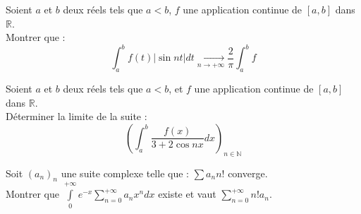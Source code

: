 \begin{exer}
Soient $a$ et $b$ deux réels tels que $a < b$, $f$ une application continue de $[a,b]$ dans $\mathbb{R}$.\\
Montrer que :\[\int_a^b f(t) | \sin nt | dt \underset{n\rightarrow + \infty}{\longrightarrow} \frac{2}{\pi} \int_a^b f\]
\end{exer}

\begin{exer}
Soient $a$ et $b$ deux réels tels que $a < b$, et $f$ une application continue de $[a,b]$ dans $\mathbb{R}$.\\
Déterminer la limite de la suite :\[\left(\int_a^b \frac{f(x)}{3 + 2 \cos nx} dx \right)_{n \in \mathbb{N}}\]
\end{exer}

\begin{exer}
Soit $(a_n)_n$ une suite complexe telle que : $\sum a_n n!$ converge.\\
Montrer que $\int\limits_0^{+\infty} e^{-x}\sum\limits_{n=0}^{+\infty}a_nx^n dx$ existe et vaut %
$\sum\limits_{n=0}^{+\infty}n! a_n$.
\end{exer}